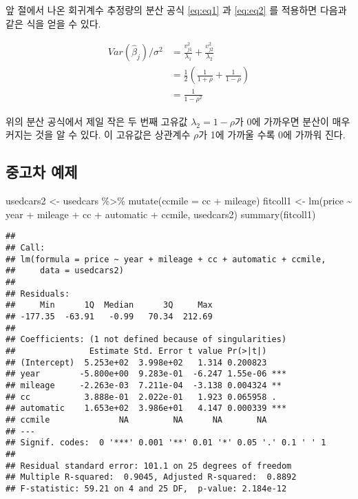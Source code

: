 \documentclass[
]{book}
\newenvironment{Shaded}{\begin{snugshade}}{\end{snugshade}}
\newcommand{\AttributeTok}[1]{\textcolor[rgb]{0.77,0.63,0.00}{#1}}
\newcommand{\FunctionTok}[1]{\textcolor[rgb]{0.00,0.00,0.00}{#1}}
\newcommand{\NormalTok}[1]{#1}
\newcommand{\OtherTok}[1]{\textcolor[rgb]{0.56,0.35,0.01}{#1}}
\newcommand{\SpecialCharTok}[1]{\textcolor[rgb]{0.00,0.00,0.00}{#1}}
\begin{document}
앞 절에서 나온 회귀계수 추정량의 분산 공식 \eqref{eq:eq1} 과 \eqref{eq:eq2} 를 적용하면 다음과 같은 식을 얻을 수 있다.

\begin{align*}
Var(\hat \beta_j)/\sigma^2 
& = \frac{v^2_{j1}}{\lambda_1} + \frac{v^2_{j2}}{\lambda_2} \\
& = \frac{1}{2} \left ( \frac{1}{1+\rho} + \frac{1}{1-\rho} \right ) \\
& = \frac{1}{1-\rho^2}
\end{align*}

위의 분산 공식에서 제일 작은 두 번째 고유값 \(\lambda_2 = 1- \rho\)가 0에 가까우면 분산이 매우 커지는 것을 알 수 있다. 이 고유값은 상관계수 \(\rho\)가 1에 가까울 수록 0에 가까워 진다.

\hypertarget{uxc911uxace0uxcc28-uxc608uxc81c}{%
\subsection{중고차 예제}\label{uxc911uxace0uxcc28-uxc608uxc81c}}

\begin{Shaded}
\begin{Highlighting}[]
\NormalTok{usedcars2 }\OtherTok{\textless{}{-}}\NormalTok{ usedcars }\SpecialCharTok{\%\textgreater{}\%}  \FunctionTok{mutate}\NormalTok{(}\AttributeTok{ccmile =}\NormalTok{ cc }\SpecialCharTok{+}\NormalTok{ mileage)}
\NormalTok{fitcoll1 }\OtherTok{\textless{}{-}} \FunctionTok{lm}\NormalTok{(price }\SpecialCharTok{\textasciitilde{}}\NormalTok{ year }\SpecialCharTok{+}\NormalTok{ mileage }\SpecialCharTok{+}\NormalTok{ cc }\SpecialCharTok{+}\NormalTok{ automatic }\SpecialCharTok{+}\NormalTok{ ccmile, usedcars2)}
\FunctionTok{summary}\NormalTok{(fitcoll1)}
\end{Highlighting}
\end{Shaded}

\begin{verbatim}
## 
## Call:
## lm(formula = price ~ year + mileage + cc + automatic + ccmile, 
##     data = usedcars2)
## 
## Residuals:
##     Min      1Q  Median      3Q     Max 
## -177.35  -63.91   -0.99   70.34  212.69 
## 
## Coefficients: (1 not defined because of singularities)
##               Estimate Std. Error t value Pr(>|t|)    
## (Intercept)  5.253e+02  3.998e+02   1.314 0.200823    
## year        -5.800e+00  9.283e-01  -6.247 1.55e-06 ***
## mileage     -2.263e-03  7.211e-04  -3.138 0.004324 ** 
## cc           3.888e-01  2.022e-01   1.923 0.065958 .  
## automatic    1.653e+02  3.986e+01   4.147 0.000339 ***
## ccmile              NA         NA      NA       NA    
## ---
## Signif. codes:  0 '***' 0.001 '**' 0.01 '*' 0.05 '.' 0.1 ' ' 1
## 
## Residual standard error: 101.1 on 25 degrees of freedom
## Multiple R-squared:  0.9045, Adjusted R-squared:  0.8892 
## F-statistic: 59.21 on 4 and 25 DF,  p-value: 2.184e-12
\end{verbatim}
\end{document}
